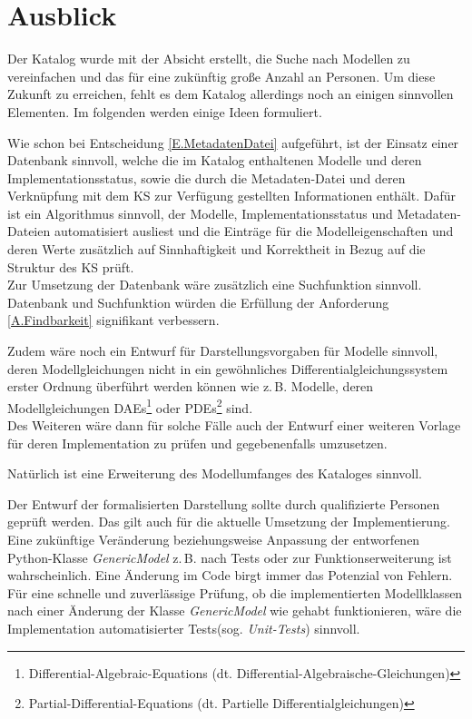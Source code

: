 \section{Ausblick} 
\label{Ch:ZsmfsgAusblick:Sec:Ausblick}
Der Katalog wurde mit der Absicht erstellt, die Suche nach Modellen zu vereinfachen und das für eine zukünftig große Anzahl an Personen. Um diese Zukunft zu erreichen,  fehlt es dem Katalog allerdings noch an einigen sinnvollen Elementen. Im folgenden werden einige Ideen formuliert.

Wie schon bei Entscheidung \ref{E.MetadatenDatei} aufgeführt, ist der Einsatz einer Datenbank sinnvoll, welche die im Katalog enthaltenen Modelle und deren Implementationsstatus, sowie die durch die Metadaten-Datei und deren Verknüpfung mit dem KS zur Verfügung gestellten Informationen enthält. Dafür ist ein Algorithmus sinnvoll, der Modelle, Implementationsstatus und Metadaten-Dateien automatisiert ausliest und die Einträge für die Modelleigenschaften und deren Werte zusätzlich auf Sinnhaftigkeit und Korrektheit in Bezug auf die Struktur des KS prüft. \\
Zur Umsetzung der Datenbank wäre zusätzlich eine Suchfunktion sinnvoll. Datenbank und Suchfunktion würden die Erfüllung der Anforderung \ref{A.Findbarkeit} signifikant verbessern.

Zudem wäre noch ein Entwurf für Darstellungsvorgaben für Modelle sinnvoll, deren Modellgleichungen nicht in ein gewöhnliches Differentialgleichungssystem erster Ordnung überführt werden können wie z.\,B. Modelle, deren Modellgleichungen DAEs\footnote{Differential-Algebraic-Equations (dt. Differential-Algebraische-Gleichungen)} oder PDEs\footnote{Partial-Differential-Equations (dt. Partielle Differentialgleichungen)} sind.\\
Des Weiteren wäre dann für solche Fälle auch der Entwurf einer weiteren Vorlage für deren Implementation zu prüfen und gegebenenfalls umzusetzen.

Natürlich ist eine Erweiterung des Modellumfanges des Kataloges sinnvoll.

Der Entwurf der formalisierten Darstellung sollte durch qualifizierte Personen geprüft werden. Das gilt auch für die aktuelle Umsetzung der Implementierung. \\
Eine zukünftige Veränderung beziehungsweise Anpassung der entworfenen Python-Klasse \textit{GenericModel} z.\,B. nach Tests oder zur Funktionserweiterung ist wahrscheinlich. Eine Änderung im Code birgt immer das Potenzial von Fehlern. Für eine schnelle und zuverlässige Prüfung, ob die implementierten Modellklassen nach einer Änderung der Klasse \textit{GenericModel} wie gehabt funktionieren, wäre die Implementation automatisierter Tests(sog. \textit{Unit-Tests}) sinnvoll.

